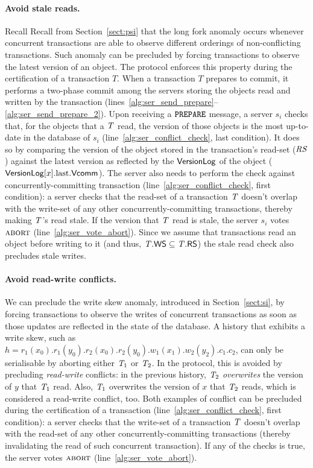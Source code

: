 \paragraph{Avoid stale reads.} Recall Recall from Section~\ref{sect:psi} that the long fork anomaly occurs whenever concurrent transactions are able to observe different orderings of non-conflicting transactions. Such anomaly can be precluded by forcing transactions to observe the latest version of an object. The protocol enforces this property during the certification of a transaction $T$. When a transaction $T$ prepares to commit, it performs a two-phase commit among the servers storing the objects read and written by the transaction (lines~\ref{alg:ser_send_prepare}--\ref{alg:ser_send_prepare_2}). Upon receiving a ${\tt PREPARE}$ message, a server $s_i$ checks that, for the objects that a $\mathit{T}$ read, the version of those objects is the most up-to-date in the database of $s_i$ (line~\ref{alg:ser_conflict_check}, last condition). It does so by comparing the version of the object stored in the transaction's read-set ($\mathit{RS}$) against the latest version as reflected by the $\mathsf{VersionLog}$ of the object ($\mathsf{VersionLog}[x].{\rm last}.\mathsf{Vcomm}$). The server also needs to perform the check against concurrently-committing transaction (line~\ref{alg:ser_conflict_check}, first condition): a server checks that the read-set of a transaction $\mathit{T}$ doesn't overlap with the write-set of any other concurrently-committing transactions, thereby making $\mathit{T}$'s read stale. If the version that $\mathit{T}$ read is stale, the server $s_i$ votes $\text{\sc abort}$ (line~\ref{alg:ser_vote_abort}). Since we assume that transactions read an object before writing to it (and thus, $\mathit{T}.\mathsf{WS} \subseteq \mathit{T}.\mathsf{RS}$) the stale read check also precludes stale writes.

\paragraph{Avoid read-write conflicts.} We can preclude the write skew anomaly, introduced in Section~\ref{sect:si}, by forcing transactions to observe the writes of concurrent transactions as soon as those updates are reflected in the state of the database. A history that exhibits a write skew, such as $h = r_1(x_0).r_1(y_0).r_2(x_0).r_2(y_0).w_1(x_1).w_2(y_2).c_1.c_2$, can only be serialisable by aborting either $\mathit{T}_1$ or $\mathit{T}_2$. In the protocol, this is avoided by precluding \emph{read-write} conflicts: in the previous history, $\mathit{T}_2$ \emph{overwrites} the version of $y$ that $\mathit{T}_1$ read. Also, $\mathit{T}_1$ overwrites the version of $x$ that $\mathit{T}_2$ reads, which is considered a read-write conflict, too. Both examples of conflict can be precluded during the certification of a transaction (line~\ref{alg:ser_conflict_check}, first condition): a server checks that the write-set of a transaction $\mathit{T}$ doesn't overlap with the read-set of any other concurrently-committing transactions (thereby invalidating the read of such concurrent transaction). If any of the checks is true, the server votes $\text{\sc abort}$ (line~\ref{alg:ser_vote_abort}).

